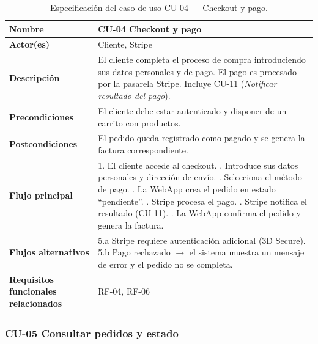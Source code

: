 \begin{table}[H]
\centering
\small
\begin{tabular}{|m{}|m{}|}
\hline
\textbf{Nombre} & CU-04 Checkout y pago \\ \hline
\textbf{Actor(es)} & Cliente, Stripe \\ \hline
\textbf{Descripción} & El cliente completa el proceso de compra introduciendo sus datos personales y de pago. El pago es procesado por la pasarela Stripe. Incluye CU-11 (\textit{Notificar resultado del pago}). \\ \hline
\textbf{Precondiciones} & El cliente debe estar autenticado y disponer de un carrito con productos. \\ \hline
\textbf{Postcondiciones} & El pedido queda registrado como pagado y se genera la factura correspondiente. \\ \hline
\textbf{Flujo principal} & 1. El cliente accede al checkout. \newline 2. Introduce sus datos personales y dirección de envío. \newline 3. Selecciona el método de pago. \newline 4. La WebApp crea el pedido en estado ``pendiente''. \newline 5. Stripe procesa el pago. \newline 6. Stripe notifica el resultado (CU-11). \newline 7. La WebApp confirma el pedido y genera la factura. \\ \hline
\textbf{Flujos alternativos} & 5.a Stripe requiere autenticación adicional (3D Secure). \newline 5.b Pago rechazado $\rightarrow$ el sistema muestra un mensaje de error y el pedido no se completa. \\ \hline
\textbf{Requisitos funcionales relacionados} & RF-04, RF-06 \\ \hline
\end{tabular}
\caption{Especificación del caso de uso CU-04 — Checkout y pago.}
\end{table}

\subsubsection{CU-05 Consultar pedidos y estado}

